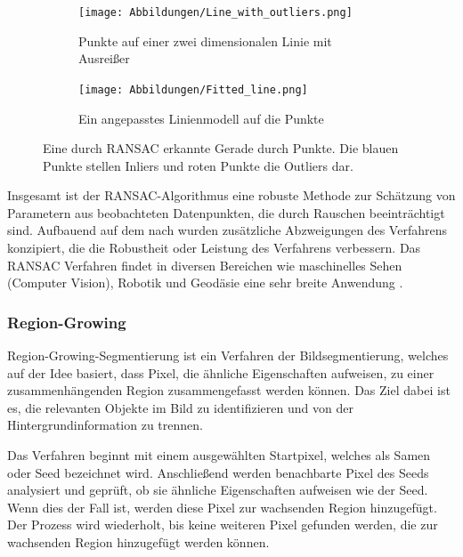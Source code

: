 \begin{figure}[!b]
	\centering
	\begin{subfigure}{0.43\textwidth}
		\texttt{[image: Abbildungen/Line\_with\_outliers.png]}
		\centering
		\caption[Linie mit Ausreißer]{Punkte auf einer zwei dimensionalen Linie mit Ausreißer}
		\label{fig: line_with_outliers}
	\end{subfigure}
	\hfill
	\begin{subfigure}{0.43\textwidth}
		\texttt{[image: Abbildungen/Fitted\_line.png]}
		\centering
		\caption[Linienmodell für eine Linie]{Ein angepasstes Linienmodell auf die Punkte}
		\label{fig: fitted_line}
	\end{subfigure}
	\caption[Visualisierung des RANSAC-Verfahrens]{Eine durch RANSAC erkannte Gerade durch Punkte. Die blauen Punkte stellen Inliers und roten Punkte die Outliers dar.}
	\label{fig: ransac_line}
\end{figure}

Insgesamt ist der RANSAC-Algorithmus eine robuste Methode zur Schätzung von Parametern aus beobachteten Datenpunkten, die durch Rauschen beeinträchtigt sind. Aufbauend auf dem nach \textcite{fischler_random_1981} wurden zusätzliche Abzweigungen des Verfahrens konzipiert, die die Robustheit oder Leistung des Verfahrens verbessern. Das RANSAC Verfahren findet in diversen Bereichen wie maschinelles Sehen (Computer Vision), Robotik und Geodäsie eine sehr breite Anwendung \autocite[2]{martinez-otzeta_ransac_2023}.

\subsubsection{Region-Growing}
Region-Growing-Segmentierung ist ein Verfahren der Bildsegmentierung, welches auf der Idee basiert, dass Pixel, die ähnliche Eigenschaften aufweisen, zu einer zusammenhängenden Region zusammengefasst werden können. Das Ziel dabei ist es, die relevanten Objekte im Bild zu identifizieren und von der Hintergrundinformation zu trennen. \autocite[641]{adams_seeded_1994}

Das Verfahren beginnt mit einem ausgewählten Startpixel, welches als Samen oder Seed bezeichnet wird. Anschließend werden benachbarte Pixel des Seeds analysiert und geprüft, ob sie ähnliche Eigenschaften aufweisen wie der Seed. Wenn dies der Fall ist, werden diese Pixel zur wachsenden Region hinzugefügt. Der Prozess wird wiederholt, bis keine weiteren Pixel gefunden werden, die zur wachsenden Region hinzugefügt werden können.\autocite[641-642]{adams_seeded_1994}


